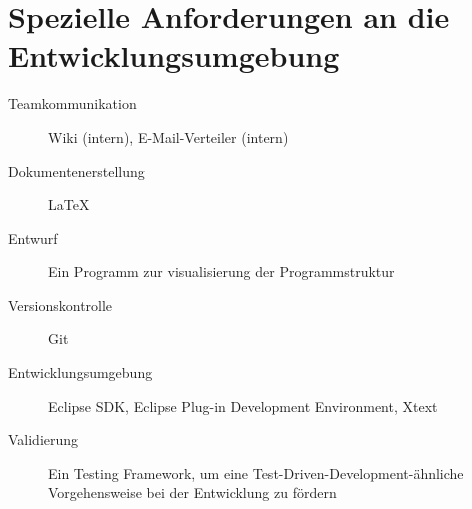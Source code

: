 \section{Spezielle Anforderungen an die Entwicklungsumgebung}%

\begin{description}%
    \item [Teamkommunikation] Wiki (intern), E-Mail-Verteiler (intern)
    \item [Dokumentenerstellung] \see \LaTeX{}%
    \item [Entwurf] Ein Programm zur visualisierung der Programmstruktur
    \item [Versionskontrolle] \see Git%
    \item [Entwicklungsumgebung] \see Eclipse SDK, \see Eclipse Plug-in Development Environment, \see Xtext%
    \item [Validierung] Ein Testing Framework, um eine Test-Driven-Development-ähnliche Vorgehensweise bei der Entwicklung zu fördern
\end{description}%
